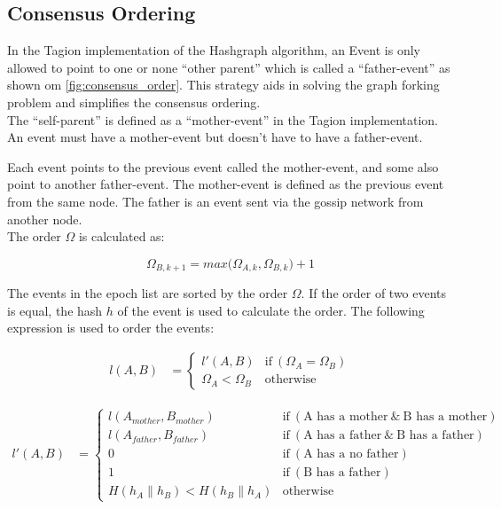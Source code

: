\subsection{Consensus Ordering}
In the Tagion implementation of the Hashgraph algorithm, an Event is only allowed to point to one or none ``other parent'' which is called a ``father-event'' as shown om \cref{fig:consensus_order}. This strategy aids in solving the graph forking problem and simplifies the consensus ordering.\\
The ``self-parent'' is defined as a ``mother-event'' in the Tagion implementation. An event must have a mother-event but doesn't have to have a father-event.

Each event points to the previous event called the mother-event, and some also point to another father-event. The mother-event is defined as the previous event from the same node. The father is an event sent via the gossip network from another node. \\

The order $\Omega$ is calculated as:

\begin{equation}
 \Omega_{B,k+1} = max \big(\Omega_{A,k} , \Omega_{B,k} \big) +1
\end{equation}

The events in the epoch list are sorted by the order $\Omega$. If the order of two events is equal, the hash $h$ of the event is used to calculate the order.
The following expression is used to order the events:

\begin{align}
 {l}(A,B) & = 
    \begin{cases}
         {l'}(A,B) &  	\text{if}  ~ ({\Omega}_{A} = {\Omega}_{B} )  \\ 
        {{\Omega}_{A} < {\Omega}_{B}} & 
        \text{otherwise}
    \end{cases} 
    \label{equ:order}    
\end{align}

\begin{align}
{l'}(A,B) & = 
\begin{cases}
{l}(A_{mother},B_{mother}) &  	
\text{if}  ~ (\text{A has a mother} ~ \&  ~ \text{B has a mother}) \\ 
{l}(A_{father},B_{father}) &  	
\text{if}  ~ (\text{A has a father} ~ \&  ~ \text{B has a father}) \\ 
0 &  	
\text{if}  ~ (\text{A has a no father}) \\ 
1 &  	
\text{if}  ~ (\text{B has a father}) \\ 
H (    {h}_{A} \parallel {h}_{B} )  < H (    {h}_{B} \parallel {h}_{A} ) & 
\text{otherwise}
\end{cases} 
\end{align}



